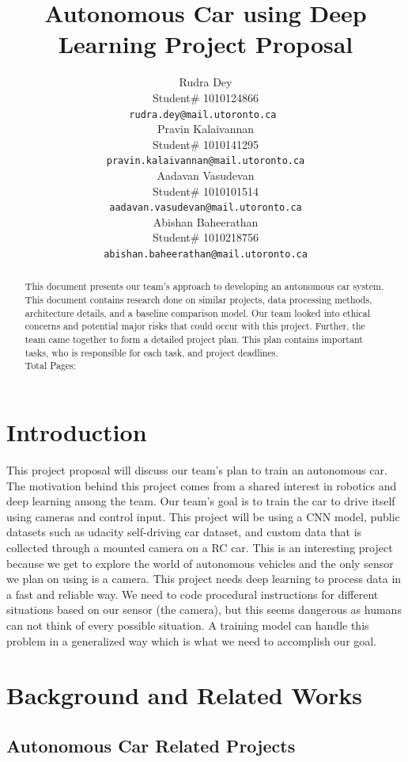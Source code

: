 \documentclass{article} %
\title{Autonomous Car using Deep Learning Project Proposal\\}
\author{Rudra Dey  \\
Student\# 1010124866\\
\texttt{rudra.dey@mail.utoronto.ca } \\
\And
Pravin Kalaivannan  \\
Student\# 1010141295 \\
\texttt{pravin.kalaivannan@mail.utoronto.ca} \\
\AND
Aadavan Vasudevan  \\
Student\# 1010101514 \\
\texttt{aadavan.vasudevan@mail.utoronto.ca} \\
\And
Abishan Baheerathan \\
Student\# 1010218756 \\
\texttt{abishan.baheerathan@mail.utoronto.ca} \\
\AND
}
\begin{document}
\maketitle

\begin{abstract}
This document presents our team's approach to developing an autonomous car system. This document contains research done on similar projects, data processing methods, 
architecture details, and a baseline comparison model. Our team looked into ethical 
concerns and potential major risks that could occur with this project. Further, the team came 
together to form a detailed project plan. This plan contains important tasks, 
who is responsible for each task, and project deadlines.\\
Total Pages: \pageref{last_page}
\end{abstract}



\section{Introduction}


This project proposal will discuss our team’s plan to train an 
autonomous car. The motivation behind this project comes from a shared interest in robotics and deep 
learning among the team. Our team’s goal is to train the car to drive itself using cameras and control 
input. This project will be using a CNN model, public datasets such as udacity self-driving car dataset, 
and custom data that is collected through a mounted camera on a RC car. This is an interesting project 
because we get to explore the world of autonomous vehicles and the only sensor we plan on using is a camera. 
This project needs deep learning to process data in a fast and reliable way. We need to code procedural 
instructions for different situations based on our sensor (the camera), but this seems dangerous as humans 
can not think of every possible situation. A training model can handle this problem in a generalized way 
which is what we need to accomplish our goal. 
 



\section{Background and Related Works}
\label{headings}

\subsection{Autonomous Car Related Projects}
\end{document}

